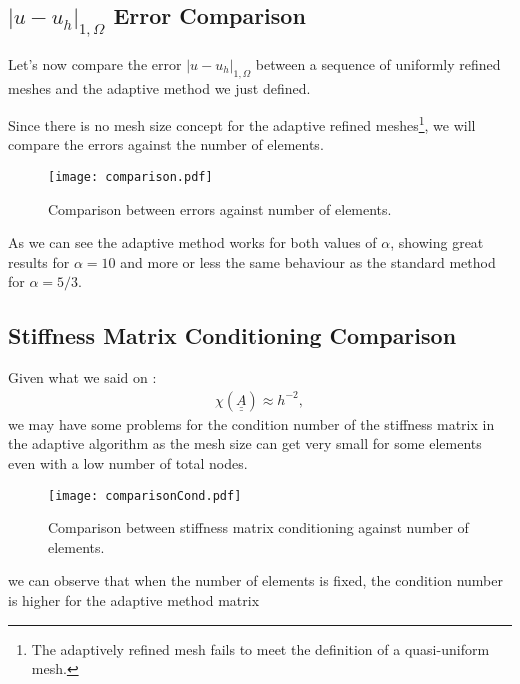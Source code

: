 \subsection[Error Comparison]{$|u - u_h|_{1, \Omega}$ Error Comparison}

Let's now compare the error $|u - u_h|_{1, \Omega}$ between a sequence of uniformly refined meshes and the adaptive method we just defined.

Since there is no mesh size concept for the adaptive refined meshes\footnote{The adaptively refined mesh fails to meet the definition of a quasi-uniform mesh.}, we will compare the errors against the number of elements.

\begin{figure}[!ht]
	\centering
	\texttt{[image: comparison.pdf]}
	\caption{Comparison between errors against number of elements.}
\end{figure}

As we can see the adaptive method works for both values of $\alpha$, showing great results for $\alpha = 10$ and more or less the same behaviour as the standard method for $\alpha = 5/3$.

\newpage
\begin{multicols}{2}
	
\end{multicols}

\newpage
\subsection{Stiffness Matrix Conditioning Comparison}

Given what we said on :
\begin{gather}
	\chi(\underline{\underline{A}}) \approx h^{-2},
\end{gather}
we may have some problems for the condition number of the stiffness matrix in the adaptive algorithm as the mesh size can get very small for some elements even with a low number of total nodes.

\begin{figure}[!ht]
	\centering
	\texttt{[image: comparisonCond.pdf]}
	\caption{Comparison between stiffness matrix conditioning against number of elements.}
\end{figure}

we can observe that when the number of elements is fixed, the condition number is higher for the adaptive method matrix 

\newpage
\begin{multicols}{2}
	
\end{multicols}